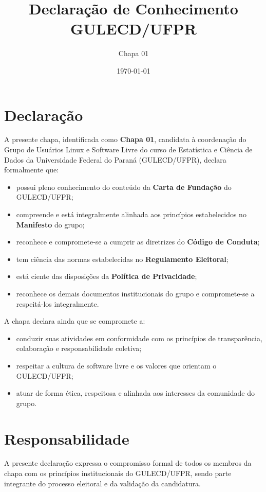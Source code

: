 \documentclass[11pt,a4paper]{article}
\title{\textbf{Declaração de Conhecimento \\ GULECD/UFPR}}
\author{Chapa 01}
\date{\today}
\begin{document}
\maketitle

\section{Declaração}

A presente chapa, identificada como \textbf{Chapa 01}, candidata à coordenação do Grupo de Usuários Linux e Software Livre do curso de Estatística e Ciência de Dados da Universidade Federal do Paraná (GULECD/UFPR), declara formalmente que:

\begin{itemize}
    \item possui pleno conhecimento do conteúdo da \textbf{Carta de Fundação} do GULECD/UFPR;
    \item compreende e está integralmente alinhada aos princípios estabelecidos no \textbf{Manifesto} do grupo;
    \item reconhece e compromete-se a cumprir as diretrizes do \textbf{Código de Conduta};
    \item tem ciência das normas estabelecidas no \textbf{Regulamento Eleitoral};
    \item está ciente das disposições da \textbf{Política de Privacidade};
    \item reconhece os demais documentos institucionais do grupo e compromete-se a respeitá-los integralmente.
\end{itemize}

A chapa declara ainda que se compromete a:

\begin{itemize}
    \item conduzir suas atividades em conformidade com os princípios de transparência, colaboração e responsabilidade coletiva;
    \item respeitar a cultura de software livre e os valores que orientam o GULECD/UFPR;
    \item atuar de forma ética, respeitosa e alinhada aos interesses da comunidade do grupo.
\end{itemize}

\section{Responsabilidade}

A presente declaração expressa o compromisso formal de todos os membros da chapa com os princípios institucionais do GULECD/UFPR, sendo parte integrante do processo eleitoral e da validação da candidatura.
\end{document}
